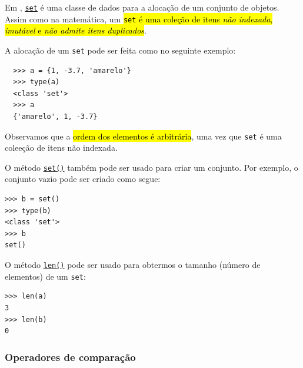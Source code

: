 Em {\python}, \href{https://docs.python.org/3/tutorial/datastructures.html\#sets}{\lstinline+set+} é uma classe de dados para a alocação de um conjunto de objetos. Assim como na matemática, um \hl{\texttt{set} é uma coleção de itens \emph{não indexada}, \emph{imutável} e \emph{não admite itens duplicados}}.

A alocação de um \lstinline+set+ pode ser feita como no seguinte exemplo:

\begin{lstlisting}
  >>> a = {1, -3.7, 'amarelo'}
  >>> type(a)
  <class 'set'>
  >>> a
  {'amarelo', 1, -3.7}
\end{lstlisting}

Observamos que a \hl{ordem dos elementos é arbitrária}, uma vez que \lstinline+set+ é uma coleeção de itens não indexada.

O método \href{https://docs.python.org/3/library/stdtypes.html\#set}{\lstinline+set()+} também pode ser usado para criar um conjunto. Por exemplo, o conjunto vazio pode ser criado como segue:

\begin{lstlisting}
>>> b = set()
>>> type(b)
<class 'set'>
>>> b
set()
\end{lstlisting}

O método \href{https://docs.python.org/3/library/functions.html\#len}{\lstinline+len()+} pode ser usado para obtermos o tamanho (número de elementos) de um \lstinline+set+:

\begin{lstlisting}
>>> len(a)
3
>>> len(b)
0
\end{lstlisting}

\subsubsection{Operadores de comparação}\label{cap_lingua_sec_colecao:sssec:opcomp}

